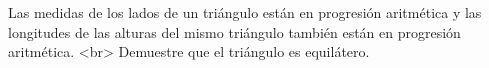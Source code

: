 Las medidas de los lados de un triángulo están en progresión aritmética y las longitudes de las alturas del mismo triángulo también están en progresión aritmética. <br>
Demuestre que el triángulo es equilátero.